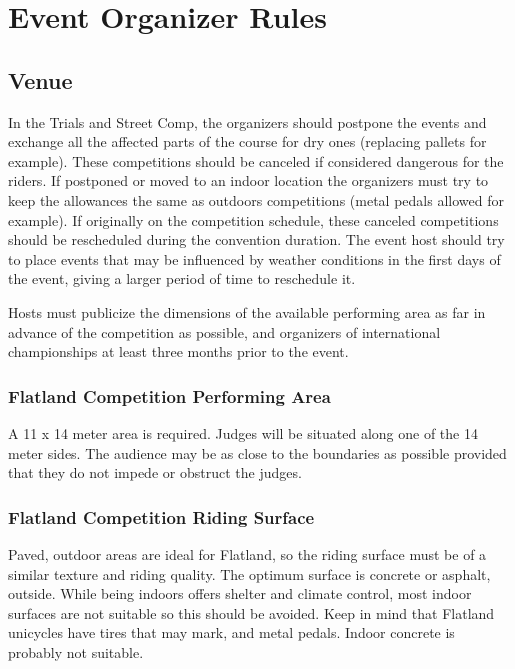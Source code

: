 \chapter{Event Organizer Rules}

\section{Venue}

In the Trials and Street Comp, the organizers should postpone the events and exchange all the affected parts of the course for dry ones (replacing pallets for example).
These competitions should be canceled if considered dangerous for the riders.
If postponed or moved to an indoor location the organizers must try to keep the allowances the same as outdoors competitions (metal pedals allowed for example).
If originally on the competition schedule, these canceled competitions should be rescheduled during the convention duration.
The event host should try to place events that may be influenced by weather conditions in the first days of the event, giving a larger period of time to reschedule it.

Hosts must publicize the dimensions of the available performing area as far in advance of the competition as possible, and organizers of international championships at least three months prior to the event.

\subsection{Flatland Competition Performing Area \label{sec:flat-street_flatland-performing-area}}
A 11 x 14 meter area is required.
Judges will be situated along one of the 14 meter sides.
The audience may be as close to the boundaries as possible provided that they do not impede or obstruct the judges.

\subsection{Flatland Competition Riding Surface}
Paved, outdoor areas are ideal for Flatland, so the riding surface must be of a similar texture and riding quality.
The optimum surface is concrete or asphalt, outside.
While being indoors offers shelter and climate control, most indoor surfaces are not suitable so this should be avoided.
Keep in mind that Flatland unicycles have tires that may mark, and metal pedals. Indoor concrete is probably not suitable.

